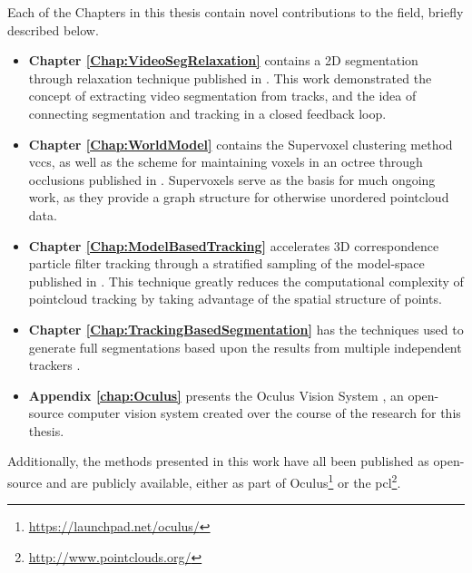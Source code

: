 Each of the Chapters in this thesis contain novel contributions to the field, briefly described below. 
\begin{itemize}
\item {\bf Chapter \ref{Chap:VideoSegRelaxation} } contains a 2D segmentation through relaxation technique published in \cite{PartFilter_Papon_2012}. This work demonstrated the concept of extracting video segmentation from tracks, and the idea of connecting segmentation and tracking in a closed feedback loop.

\item {\bf Chapter \ref{Chap:WorldModel} } contains the Supervoxel clustering method \gls{vccs}, as well as the scheme for maintaining voxels in an octree through occlusions published in \cite{VCCS_Papon_2013}. Supervoxels serve as the basis for much ongoing work, as they provide a graph structure for otherwise unordered pointcloud data.

\item {\bf Chapter \ref{Chap:ModelBasedTracking} } accelerates 3D correspondence particle filter tracking through a stratified sampling of the model-space published in \cite{PaponWACV_2015}. This technique greatly reduces the computational complexity of pointcloud tracking by taking advantage of the spatial structure of points.

\item {\bf Chapter \ref{Chap:TrackingBasedSegmentation} } has the techniques used to generate full segmentations based upon the results from multiple independent trackers \cite{PaponIros2013}. 

\item {\bf Appendix \ref{chap:Oculus} } presents the Oculus Vision System \cite{Oculus_Papon_2012}, an open-source computer vision system created over the course of the research for this thesis.
\end{itemize}

Additionally, the methods presented in this work have all been published as open-source and are publicly available, either as part of Oculus\footnote{\url{https://launchpad.net/oculus/}} or the \gls{pcl}\footnote{\url{http://www.pointclouds.org/}}.

